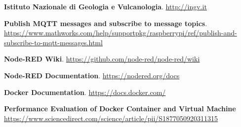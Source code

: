 \documentclass[a4paper,10pt]{memoir}
\begin{document}
\begin{thebibliography}{9}

  \textbf{Istituto Nazionale di Geologia e Vulcanologia}.
  \href{http://ingv.it}{http://ingv.it}

  \textbf{Publish MQTT messages and subscribe to message topics}.\\
  \href{https://www.mathworks.com/help/supportpkg/raspberrypi/ref/publish-and-subscribe-to-mqtt-messages.html}{https://www.mathworks.com/help/supportpkg/raspberrypi/ref/publish-and-subscribe-to-mqtt-messages.html}

  \textbf{Node-RED Wiki}.
  \href{https://github.com/node-red/node-red/wiki}{https://github.com/node-red/node-red/wiki}

  \textbf{Node-RED Documentation}.
  \href{https://nodered.org/docs}{https://nodered.org/docs}

  \textbf{Docker Documentation}.
  \href{https://docs.docker.com/}{https://docs.docker.com/}

    \textbf{Performance Evaluation of Docker Container and Virtual Machine}
    \\
    \href{https://www.sciencedirect.com/science/article/pii/S1877050920311315}{https://www.sciencedirect.com/science/article/pii/S1877050920311315}

\end{thebibliography}
\end{document}
